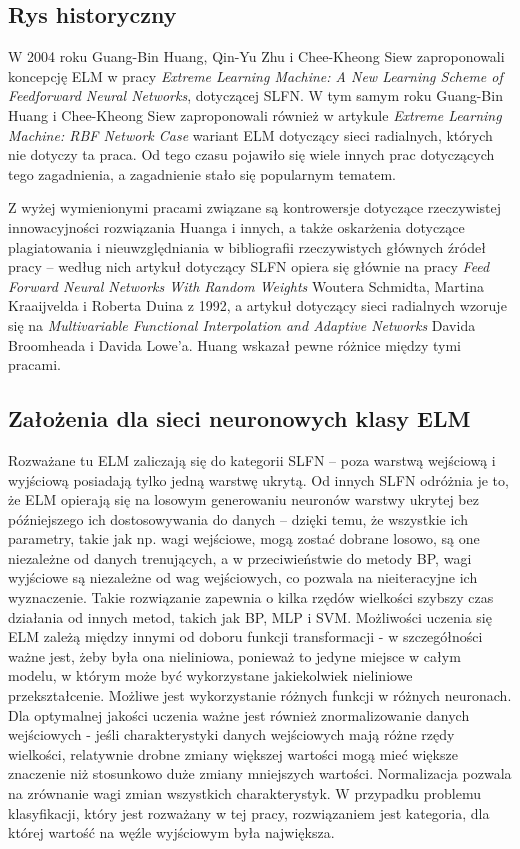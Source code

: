 \documentclass{article}
\begin{document}
\subsection{Rys historyczny}
W 2004 roku Guang-Bin Huang, Qin-Yu Zhu i Chee-Kheong Siew zaproponowali koncepcję ELM w pracy \textit{Extreme Learning Machine: A New Learning Scheme of Feedforward Neural Networks}, dotyczącej SLFN. W tym samym roku Guang-Bin Huang i Chee-Kheong Siew zaproponowali również w artykule \textit{Extreme Learning Machine: RBF Network Case} wariant ELM dotyczący sieci radialnych, których nie dotyczy ta praca. Od tego czasu pojawiło się wiele innych prac dotyczących tego zagadnienia, a zagadnienie stało się popularnym tematem. \par
Z wyżej wymienionymi pracami związane są kontrowersje dotyczące rzeczywistej innowacyjności rozwiązania Huanga i innych, a także oskarżenia dotyczące plagiatowania i nieuwzględniania w bibliografii rzeczywistych głównych źródeł pracy -- według nich artykuł dotyczący SLFN opiera się głównie na pracy \textit{Feed Forward Neural Networks With Random Weights} Woutera Schmidta, Martina Kraaijvelda i Roberta Duina z 1992, a artykuł dotyczący sieci radialnych wzoruje się na \textit{Multivariable Functional Interpolation and Adaptive Networks} Davida Broomheada i Davida Lowe'a. Huang wskazał pewne różnice między tymi pracami.
\subsection{Założenia dla sieci neuronowych klasy ELM}
Rozważane tu ELM zaliczają się do kategorii SLFN -- poza warstwą wejściową i wyjściową posiadają tylko jedną warstwę ukrytą. Od innych SLFN odróżnia je to, że ELM opierają się na losowym generowaniu neuronów warstwy ukrytej bez późniejszego ich dostosowywania do danych -- dzięki temu, że wszystkie ich parametry, takie jak np. wagi wejściowe, mogą zostać dobrane losowo, są one niezależne od danych trenujących, a w przeciwieństwie do metody BP, wagi wyjściowe są niezależne od wag wejściowych, co pozwala na nieiteracyjne ich wyznaczenie. Takie rozwiązanie zapewnia o kilka rzędów wielkości szybszy czas działania od innych metod, takich jak BP, MLP i SVM. 
Możliwości uczenia się ELM zależą między innymi od doboru funkcji transformacji - w szczegółności ważne jest, żeby była ona nieliniowa, ponieważ to jedyne miejsce w całym modelu, w którym może być wykorzystane jakiekolwiek nieliniowe przekształcenie. Możliwe jest wykorzystanie różnych funkcji w różnych neuronach. Dla optymalnej jakości uczenia ważne jest również znormalizowanie danych wejściowych - jeśli charakterystyki danych wejściowych mają różne rzędy wielkości, relatywnie drobne zmiany większej wartości mogą mieć większe znaczenie niż stosunkowo duże zmiany mniejszych wartości. Normalizacja pozwala na zrównanie wagi zmian wszystkich charakterystyk.
W przypadku problemu klasyfikacji, który jest rozważany w tej pracy, rozwiązaniem jest kategoria, dla której wartość na węźle wyjściowym była największa. 
\end{document}
